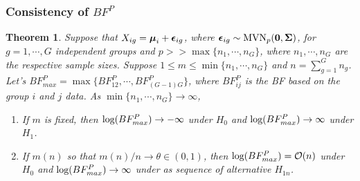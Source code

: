 \documentclass[12pt]{article}
\theoremstyle{plain}%
\newtheorem{theorem}{Theorem}
\theoremstyle{definition}
\def\bzero{{\mathbf 0}}
\def\log{\hbox{log}}
\def\MVN{\hbox{MVN}}
\def\log{\hbox{log}}
\def\bzero{{\mathbf 0}}
\newcommand{\uepsilon}          {\mbox{\boldmath$\epsilon$}}
\newcommand{\umu}               {\mbox{\boldmath$\mu$}}
\newcommand{\uSigma}            {\mbox{\boldmath$\Sigma$}}
\begin{document}
\subsubsection{Consistency of $BF^{P}$}
\begin{theorem}
Suppose that $X_{ig} = \umu_i + \uepsilon_{ig}$, where $\uepsilon_{ig} \sim \MVN_{p}(\bzero, \uSigma)$, for $g = 1, \cdots, G$ independent groups and $p >> \max\{n_1, \cdots, n_{G}\}$, where $n_1, \cdots, n_{G}$ are the respective sample sizes. Suppose $1 \leq m  \leq \min\{n_1, \cdots, n_{G}\}$ and $n = \sum^{G}_{g=1}n_g$. Let's $BF^{P}_{max} = \max\{BF^{P}_{12}, \cdots, BF^{P}_{(G-1)G}\}$, where $BF^{P}_{ij}$ is the BF based on the group $i$ and $j$ data. As $\min\{n_1, \cdots, n_{G}\} \rightarrow \infty$,
\begin{enumerate}
    \item If $m$ is fixed, then $\log(BF^{P}_{max}) \rightarrow -\infty$ under $H_0$ and $\log(BF^{P}_{max}) \rightarrow \infty$ under $H_1$.
    \item If $m(n)$ so that $m(n)/n \rightarrow \theta \in (0, 1)$, then $\log(BF^{P}_{max}) = \mathcal{O}(n)$ under $H_0$ and $\log(BF^{P}_{max}) \rightarrow \infty$ under as sequence of alternative $H_{1n}$.
\end{enumerate}
\end{theorem}
\end{document}
